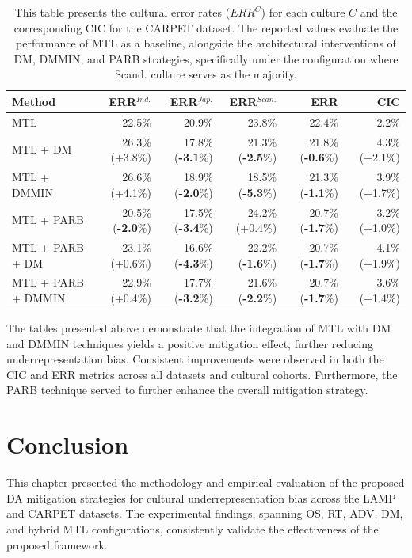 \begin{table} [H]
\centering
\scriptsize
\begin{tabular}{lrrrrr}
\toprule
\textbf{Method} & \textbf{ERR$^{Ind.}$} & \textbf{ERR$^{Jap.}$} & \textbf{ERR$^{Scan.}$} & \textbf{ERR} & \textbf{CIC} \\
\midrule
MTL & 22.5\% & 20.9\% & 23.8\% & 22.4\% & 2.2\% \\
MTL +  DM    & 26.3\% (+3.8\%) & 17.8\% (\textbf{-3.1}\%) & 21.3\% (\textbf{-2.5}\%) & 21.8\% (\textbf{-0.6}\%) & 4.3\% (+2.1\%) \\
MTL +  DMMIN & 26.6\% (+4.1\%) & 18.9\% (\textbf{-2.0}\%) & 18.5\% (\textbf{-5.3}\%) & 21.3\% (\textbf{-1.1}\%) & 3.9\% (+1.7\%) \\
\hline
MTL + PARB     & 20.5\% (\textbf{-2.0}\%) & 17.5\% (\textbf{-3.4}\%) & 24.2\% (+0.4\%) & 20.7\% (\textbf{-1.7}\%) & 3.2\% (+1.0\%) \\
MTL + PARB + DM & 23.1\% (+0.6\%) & 16.6\% (\textbf{-4.3}\%) & 22.2\% (\textbf{-1.6}\%) & 20.7\% (\textbf{-1.7}\%) & 4.1\% (+1.9\%) \\
MTL + PARB + DMMIN & 22.9\% (+0.4\%) & 17.7\% (\textbf{-3.2}\%) & 21.6\% (\textbf{-2.2}\%) & 20.7\% (\textbf{-1.7}\%) & 3.6\% (+1.4\%) \\
\bottomrule
\end{tabular}
\caption{This table presents the cultural error rates ($ERR^C$) for each culture $C$ and the corresponding CIC for the CARPET dataset. The reported values evaluate the performance of MTL as a baseline, alongside the architectural interventions of DM, DMMIN, and PARB strategies, specifically under the configuration where Scand. culture serves as the majority.}
\label{ch3:tab:mtl_and_da:CS}
\end{table}
%
The tables presented above demonstrate that the integration of MTL with DM and DMMIN techniques yields a positive mitigation effect, further reducing underrepresentation bias. Consistent improvements were observed in both the CIC and ERR metrics across all datasets and cultural cohorts. Furthermore, the PARB technique served to further enhance the overall mitigation strategy.

\section{Conclusion}
This chapter presented the methodology and empirical evaluation of the proposed DA mitigation strategies for cultural underrepresentation bias across the LAMP and CARPET datasets. 
The experimental findings, spanning OS, RT, ADV, DM, and hybrid MTL configurations, consistently validate the effectiveness of the proposed framework.

